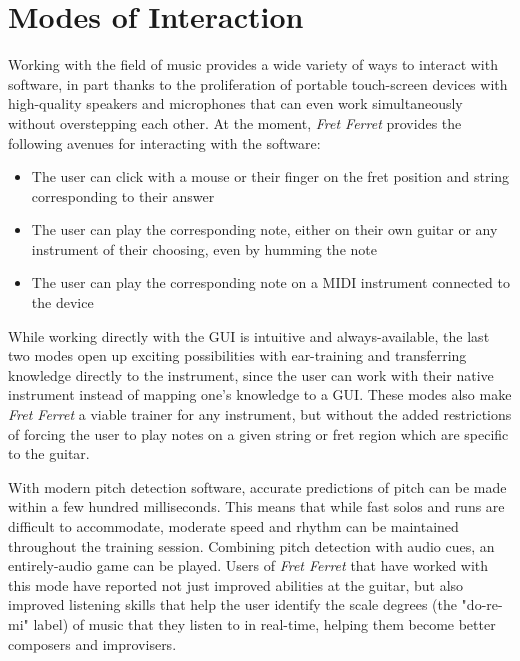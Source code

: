 \documentclass[manuscript, nonacm]{acmart_no_footer}
\begin{document}
\section{Modes of Interaction}

Working with the field of music provides a wide variety of ways to interact with software, in part thanks to the proliferation of portable touch-screen devices with high-quality speakers and microphones that can even work simultaneously without overstepping each other. At the moment, \textit{Fret Ferret} provides the following avenues for interacting with the software:
\begin{itemize}
\item The user can click with a mouse or their finger on the fret position and string corresponding to their answer
\item The user can play the corresponding note, either on their own guitar or any instrument of their choosing, even by humming the note
\item The user can play the corresponding note on a MIDI instrument connected to the device
\end{itemize} While working directly with the GUI is intuitive and always-available, the last two modes open up exciting possibilities with ear-training and transferring knowledge directly to the instrument, since the user can work with their native instrument instead of mapping one's knowledge to a GUI. These modes also make \textit{Fret Ferret} a viable trainer for any instrument, but without the added restrictions of forcing the user to play notes on a given string or fret region which are specific to the guitar. 

With modern pitch detection software\cite{pitchfinder}, accurate predictions of pitch can be made within a few hundred milliseconds. This means that while fast solos and runs are difficult to accommodate, moderate speed and rhythm can be maintained throughout the training session. Combining pitch detection with audio cues, an entirely-audio game can be played. Users of \textit{Fret Ferret} that have worked with this mode have reported not just improved abilities at the guitar, but also improved listening skills that help the user identify the scale degrees (the "do-re-mi" label) of music that they listen to in real-time, helping them become better composers and improvisers.
\end{document}
